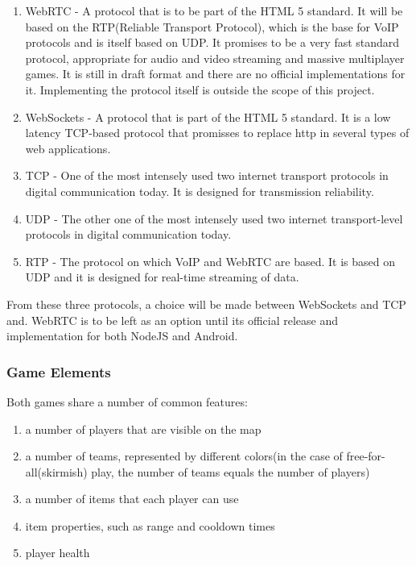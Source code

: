 \documentclass{article}
\begin{document}
\begin{enumerate}
	\item WebRTC - A protocol that is to be part of the HTML 5 standard. It will be
	based on the RTP(Reliable Transport Protocol), which is the base for VoIP
	protocols and is itself based on UDP. It promises to be a very fast standard
	protocol, appropriate for audio and video streaming and massive multiplayer
	games.\cite{webrtc} It is still in draft format and there are no official
	implementations for it. Implementing the protocol itself is outside the scope
	of this project.
	\item WebSockets - A protocol that is part of the HTML 5 standard. It is a low
	latency TCP-based protocol that promisses to replace http in several types of
	web applications.\cite{websockets}
	\item TCP - One of the most intensely used two internet transport protocols in
	digital communication today. It is designed for transmission reliability.\cite{tcp}
	\item UDP - The other one of the most intensely used two internet
	transport-level protocols in digital communication today.\cite{udp}
	\item RTP - The protocol on which VoIP and WebRTC are based. It is based on UDP
	and it is designed for real-time streaming of data.\cite{rtp}
\end{enumerate}

From these three protocols, a choice will be made between WebSockets and TCP
and.
WebRTC is to be left as an option until its official release and implementation
for both NodeJS and Android.

\subsubsection{Game Elements}

Both games share a number of common features:
\begin{enumerate}
  \item a number of players that are visible on the map
  \item a number of teams, represented by different colors(in the case of
  free-for-all(skirmish) play, the number of teams equals the number of players)  
  \item a number of items that each player can use
  \item item properties, such as range and cooldown times
  \item player health
\end{enumerate} 
\end{document}
